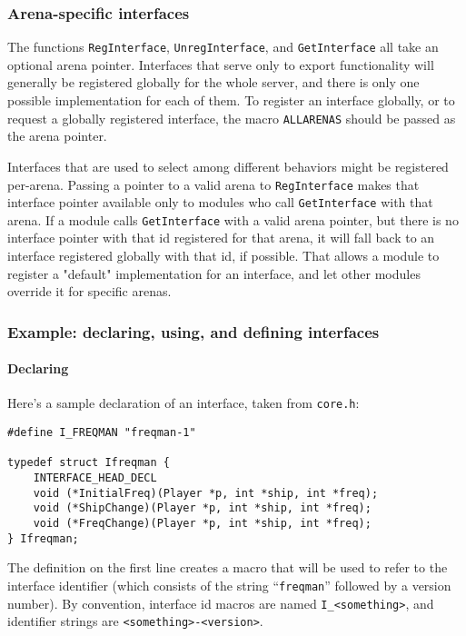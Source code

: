 \documentclass{article}
\begin{document}
\subsubsection{Arena-specific interfaces}

The functions \verb/RegInterface/, \verb/UnregInterface/, and
\verb/GetInterface/ all take an optional arena pointer. Interfaces that
serve only to export functionality will generally be registered globally
for the whole server, and there is only one possible implementation for
each of them. To register an interface globally, or to request a
globally registered interface, the macro \verb/ALLARENAS/ should be
passed as the arena pointer.

Interfaces that are used to select among different behaviors might be
registered per-arena. Passing a pointer to a valid arena to
\verb/RegInterface/ makes that interface pointer available only to
modules who call \verb/GetInterface/ with that arena. If a module calls
\verb/GetInterface/ with a valid arena pointer, but there is no
interface pointer with that id registered for that arena, it will fall
back to an interface registered globally with that id, if possible. That
allows a module to register a "default" implementation for an interface,
and let other modules override it for specific arenas.


\subsubsection{Example: declaring, using, and defining interfaces}

\paragraph{Declaring}
Here's a sample declaration of an interface, taken from \verb/core.h/:

\begin{verbatim}
#define I_FREQMAN "freqman-1"

typedef struct Ifreqman {
    INTERFACE_HEAD_DECL
    void (*InitialFreq)(Player *p, int *ship, int *freq);
    void (*ShipChange)(Player *p, int *ship, int *freq);
    void (*FreqChange)(Player *p, int *ship, int *freq);
} Ifreqman;
\end{verbatim}

The definition on the first line creates a macro that will be used to
refer to the interface identifier (which consists of the string
``\verb/freqman/'' followed by a version number). By convention,
interface id macros are named \verb/I_<something>/, and identifier
strings are \verb/<something>-<version>/.
\end{document}
